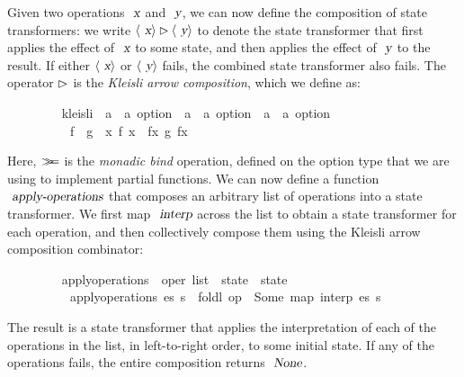 Given two operations $\isa{x}$ and $\isa{y}$, we can now define the composition of state transformers: we write $\langle\isa{x}\rangle \mathbin{\isasymrhd} \langle\isa{y}\rangle$ to denote the state transformer that first applies the effect of $\isa{x}$ to some state, and then applies the effect of $\isa{y}$ to the result.
If either $\langle\isa{x}\rangle$ or $\langle\isa{y}\rangle$ fails, the combined state transformer also fails.
The operator $\emph{$\rhd$}$ is the \emph{Kleisli arrow composition}, which we define as:
\vspace{0.375em}
\begin{isabellebody}
\ \ \ \ \ \ \ \  kleisli\ {\isacharcolon}{\isacharcolon}\ {\isachardoublequoteopen}{\isacharparenleft}{\isacharprime}a\ {\isasymRightarrow}\ {\isacharprime}a\ option{\isacharparenright}\ {\isasymRightarrow}\ {\isacharparenleft}{\isacharprime}a\ {\isasymRightarrow}\ {\isacharprime}a\ option{\isacharparenright}\ {\isasymRightarrow}\ {\isacharparenleft}{\isacharprime}a\ {\isasymRightarrow}\ {\isacharprime}a\ option{\isacharparenright}{\isachardoublequoteclose}\ {\isacharparenleft}\ {\isachardoublequoteopen}{\isasymrhd}{\isachardoublequoteclose}\ {}{}{\isacharparenright}\ \isanewline
\ \ \ \ \ \ \ \ \ \ {\isachardoublequoteopen}f\ {\isasymrhd}\ g\ {\isasymequiv}\ {\isasymlambda}x{\isachardot}\ f\ x\ {\isasymbind}\ {\isacharparenleft}{\isasymlambda}fx{\isachardot}\ g\ fx{\isacharparenright}{\isachardoublequoteclose}
\end{isabellebody}
\vspace{0.375em}
Here, $\emph{$\mathbin{>\!\!\!>\mkern-6.7mu=}$}$ is the \emph{monadic bind} operation, defined on the option type that we are using to implement partial functions.
We can now define a function $\isa{apply-operations}$ that composes an arbitrary list of operations into a state transformer.
We first map $\isa{interp}$ across the list to obtain a state transformer for each operation, and then collectively compose them using the Kleisli arrow composition combinator:
\vspace{0.375em}
\begin{isabellebody}
\ \ \ \ \ \ \ \  apply{\isacharunderscore}operations\ {\isacharcolon}{\isacharcolon}\ {\isachardoublequoteopen}{\isacharprime}oper\ list\ {\isasymRightarrow}\ {\isacharprime}state\ {\isasymrightharpoonup}\ {\isacharprime}state{\isachardoublequoteclose}\ \isanewline
\ \ \ \ \ \ \ \ \ \ {\isachardoublequoteopen}apply{\isacharunderscore}operations\ es\ s\ {\isasymequiv}\ {\isacharparenleft}foldl\ {\isacharparenleft}op\ {\isasymrhd}{\isacharparenright}\ Some\ {\isacharparenleft}map\ interp\ es{\isacharparenright}{\isacharparenright}\ s{\isachardoublequoteclose}
\end{isabellebody}
\vspace{0.375em}
The result is a state transformer that applies the interpretation of each of the operations in the list, in left-to-right order, to some initial state.
If any of the operations fails, the entire composition returns $\isa{None}$.

